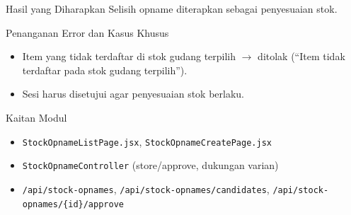 \begin{flowsection}{Hasil yang Diharapkan}
Selisih opname diterapkan sebagai penyesuaian stok.
\end{flowsection}

\begin{flowsection}{Penanganan Error dan Kasus Khusus}
\begin{itemize}
  \item Item yang tidak terdaftar di stok gudang terpilih $\rightarrow$ ditolak
        (``Item tidak terdaftar pada stok gudang terpilih'').
  \item Sesi harus disetujui agar penyesuaian stok berlaku.
\end{itemize}
\end{flowsection}

\begin{flowsection}{Kaitan Modul}
\begin{itemize}
  \item \texttt{StockOpnameListPage.jsx}, \texttt{StockOpnameCreatePage.jsx}
  \item \texttt{StockOpnameController} (store/approve, dukungan varian)
  \item \texttt{/api/stock-opnames}, \texttt{/api/stock-opnames/candidates},
        \texttt{/api/stock-opnames/\{id\}/approve}
\end{itemize}
\end{flowsection}

